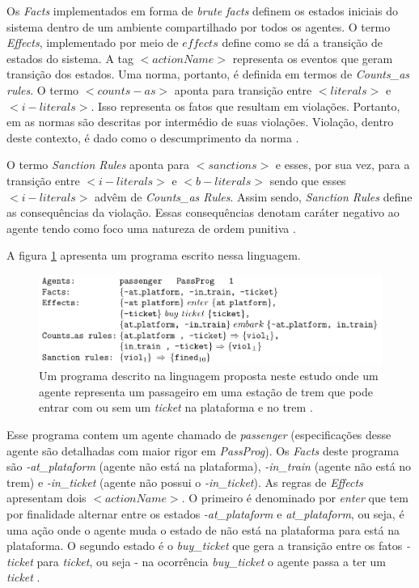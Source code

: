Os \textit{Facts} implementados em forma de \textit{brute facts} definem os estados iniciais do sistema dentro de um ambiente compartilhado por todos os agentes. O termo \textit{Effects}, implementado por meio de $effects$ define como se dá a transição de estados do sistema. A tag $<actionName>$ representa os eventos que geram transição dos estados. Uma norma, portanto, é definida em termos de \textit{Counts\_as rules}. O termo $<counts-as>$ aponta para transição entre $<literals>$ e $<i-literals>$. Isso representa os fatos que resultam em violações. Portanto, em \cite{dastaniframework} as normas são descritas por intermédio de suas violações. Violação, dentro deste contexto, é dado como o descumprimento da norma 
\cite{ontologynormative}.

O termo \textit{Sanction Rules} aponta para $<sanctions>$ e esses, por sua vez, para a transição entre $<i-literals>$ e $<b-literals>$ sendo que esses $<i-literals>$ advêm de \textit{Counts\_as Rules}. Assim sendo, \textit{Sanction Rules} define as consequências da violação. Essas consequências denotam caráter negativo ao agente tendo como foco uma natureza de ordem punitiva \cite{dastaniframework}. 

A figura \ref{exemploprograma} apresenta um programa escrito nessa linguagem. 

\begin{figure}[H]
  \centering
  \includegraphics[width=0.8\linewidth]{figure/programdastani.png} 
  \caption{Um programa descrito na linguagem proposta neste estudo onde um agente representa um passageiro em uma estação de trem que pode entrar com ou sem um \textit{ticket} na plataforma e no trem \cite{dastaniframework}.}
  \label{exemploprograma}
\end{figure}

Esse programa contem um agente chamado de \textit{passenger} (especificações desse agente são detalhadas com maior rigor em \textit{PassProg}). Os \textit{Facts} deste programa são \textit{-at\_plataform} (agente não está na plataforma), \textit{-in\_train} (agente não está no trem) e \textit{-in\_ticket} (agente não possui o \textit{-in\_ticket}). As regras de \textit{Effects} apresentam dois $<actionName>$. O primeiro é denominado por \textit{enter} que tem por finalidade alternar entre os estados \textit{-at\_plataform} e \textit{at\_plataform}, 
ou seja, é uma ação onde o agente muda o estado de não está na plataforma para está na plataforma. O segundo estado é o \textit{buy\_ticket} que gera a transição entre os fatos \textit{-ticket} para \textit{ticket}, ou seja - na ocorrência \textit{buy\_ticket} o agente passa a ter um \textit{ticket} \cite{dastaniframework}.

